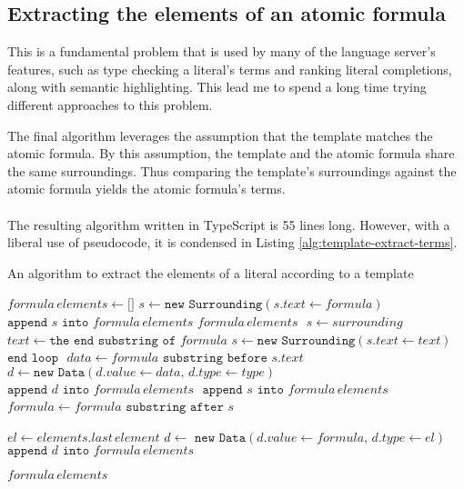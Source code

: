 \documentclass[../main.tex]{subfiles}
\begin{document}
\subsection{Extracting the elements of an atomic formula}
This is a fundamental problem that is used by many of the language server's features, such as type checking a literal's terms and ranking literal completions, along with semantic highlighting. This lead me to spend a long time trying different approaches to this problem.

The final algorithm leverages the assumption that the template matches the atomic formula. By this assumption, the template and the atomic formula share the same surroundings. Thus comparing the template's surroundings against the atomic formula yields the atomic formula's terms. 
\\
\\
The resulting algorithm written in TypeScript is 55 lines long. However, with a liberal use of pseudocode, it is condensed in Listing \ref{alg:template-extract-terms}.
\begin{algorithm}
\caption{An algorithm to extract the elements of a literal according to a template}\label{alg:template-extract-terms}
\begin{algorithmic}[1]
    \State $formula \, elements \gets \texttt{[]}$
        \State $s \gets \texttt{new Surrounding}(s.text \gets formula)$
        \State $\texttt{append } s \texttt{ into } formula \, elements$
        \State \Return $formula \, elements$
    \EndIf
    \State $ $
            \State $s \gets surrounding$
            \State $text \gets  \texttt{the end substring of } formula$
            \State $s \gets \texttt{new Surrounding}(s.text \gets text)$
        \Else
            \State $\texttt{end loop}$
        \EndIf
        \State $ $
        \State $data \gets formula \texttt{ substring before } s.text$
            \State $d \gets \texttt{new Data}(d.value \gets data, \, d.type \gets type)$
            \State $\texttt{append } d \texttt{ into } formula \, elements$
        \EndIf
        \State $ $
        \State $\texttt{append } s \texttt{ into } formula \, elements$
        \State $formula \gets formula \texttt{ substring after } s$
    \EndFor
    \State $ $
    
    \State $el \gets elements.last \, element$
        \State $d \gets \texttt{ new Data}(d.value \gets formula, \, d.type \gets el)$
        \State $\texttt{append } d \texttt{ into } formula \, elements$
    \EndIf
    
    \State \Return $formula \, elements$
\end{algorithmic}
\end{algorithm}
\end{document}
